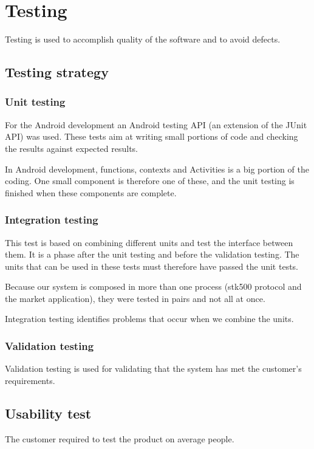 \chapter{Testing}
	Testing is used to accomplish quality of the software and to avoid defects.
	
	\section{Testing strategy}
		\subsection{Unit testing}
			For the Android development an Android testing API (an extension of the JUnit API) was used.
			These tests aim at writing small portions of code and checking the results against expected results.

			In Android development, functions, contexts and Activities is a big portion of the coding.
			One small component is therefore one of these, and the unit testing is finished when these components are complete.

		\subsection{Integration testing}
			This test is based on combining different units and test the interface between them. It is a phase after the unit testing and before the validation testing. The units that can be used in these tests must therefore have passed the unit tests.

			Because our system is composed in more than one process (stk500 protocol and the market application), they
			were tested in pairs and not all at once.

			Integration testing identifies problems that occur when we combine the units.

		\subsection{Validation testing}
			Validation testing is used for validating that the system has met the customer's requirements.

	\section{Usability test}
		The customer required to test the product on average people.
